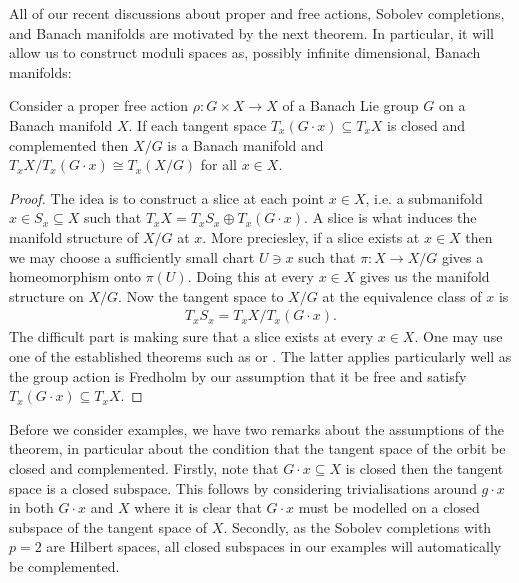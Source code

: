 \documentclass[12pt]{ociamthesis}  %
\begin{document}
All of our recent discussions about proper and free actions, Sobolev
completions, and Banach manifolds are motivated by the next theorem.
In particular, it will allow us to construct moduli spaces as, possibly
infinite dimensional, Banach manifolds:

\begin{theorem}\label{thm:banach_quotient}
  Consider a proper free action $\rho : G\times X\to X$ of a Banach
  Lie group $G$ on a Banach manifold $X$. If each tangent space
  $T_x(G\cdot x) \subseteq T_x X$ is closed and complemented then
  $X/G$ is a Banach manifold and $T_x X/T_x (G\cdot x) \cong T_x(X/G)$
  for all $x\in X$.
  \begin{proof}
    The idea is to construct a slice at each point $x\in X$, i.e. a submanifold
    $x\in S_x\subseteq X$ such that $T_x X = T_xS_x \oplus T_x(G\cdot x)$. A slice is
    what induces the manifold structure of $X/G$ at $x$. More preciesley, if a slice
    exists at $x\in X$ then we may choose a sufficiently small chart $U\ni x$
    such that $\pi : X \to X/G$ gives a homeomorphism onto $\pi(U)$. Doing this
    at every $x\in X$ gives us the manifold structure on $X/G$. Now the tangent space
    to $X/G$ at the equivalence class of $x$ is
    \begin{align}\label{eq:banach_quotient_tangent}
      T_x S_x = T_x X / T_x (G\cdot x).
    \end{align}
    The difficult part is making sure that a slice exists at every $x\in X$. One may use
    one of the established theorems such as \cite[Theorem 3.28]{diez2019}
    or \cite[Theorem 5.2.6]{palais1992}. The latter applies particularly well
    as the group action is Fredholm by our assumption that it be free and satisfy
    $T_x(G\cdot x)\subseteq T_x X$.
  \end{proof}
\end{theorem}

Before we consider examples, we have two remarks about the assumptions of the theorem,
in particular about the condition that the tangent space of the orbit be closed and
complemented. Firstly, note that $G\cdot x \subseteq X$ is closed then the tangent
space is a closed subspace. This follows by considering trivialisations around $g\cdot x$
in both $G\cdot x$ and $X$ where it is clear that $G\cdot x$ must be modelled on a closed
subspace of the tangent space of $X$. Secondly, as the Sobolev completions with $p=2$ are
Hilbert spaces, all closed subspaces in our examples will automatically be complemented.
\end{document}
